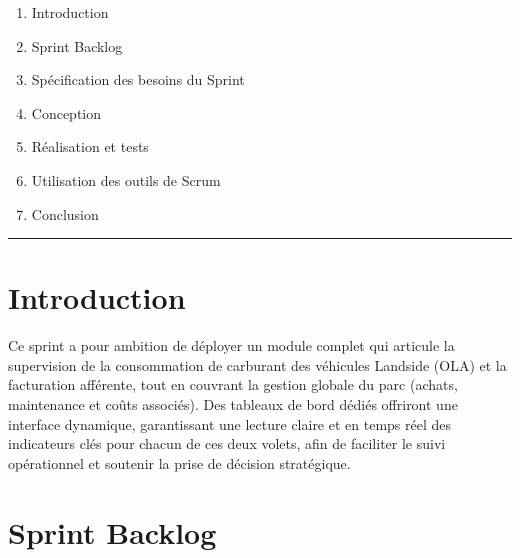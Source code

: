 \documentclass[a4paper,11pt]{report}
\begin{document}
\begin{enumerate}[%
  label=\bfseries\Large\arabic*., 
  leftmargin=2cm, 
  itemsep=1em
]
   \item Introduction
  \item Sprint Backlog
  \item Spécification des besoins du Sprint
  \item Conception
  \item Réalisation et tests
  \item Utilisation des outils de Scrum
  \item Conclusion
\end{enumerate}

\vfill
\begin{center}
  \color{blue!60!black}\rule{0.6\textwidth}{0.8pt}
\end{center}

\newpage
\setcounter{section}{0}

\section{Introduction}
Ce sprint a pour ambition de déployer un module complet qui articule la supervision de la consommation de carburant des véhicules Landside (OLA) et la facturation afférente, tout en couvrant la gestion globale du parc (achats, maintenance et coûts associés). Des tableaux de bord dédiés offriront une interface dynamique, garantissant une lecture claire et en temps réel des indicateurs clés pour chacun de ces deux volets, afin de faciliter le suivi opérationnel et soutenir la prise de décision stratégique.







\section{Sprint Backlog}
\end{document}
